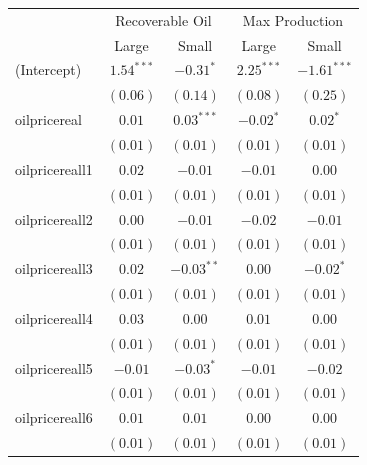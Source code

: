 \documentclass[11pt]{article}
\begin{document}
\begin{spacing}{1}
\begin{table}
\begin{center}
\begin{tabular}{l c c c c }
\hline
&\multicolumn{2}{c}{Recoverable Oil} & \multicolumn{2}{c}{Max Production} \\
                                    & Large & Small & Large & Small \\
\hline
(Intercept)                         & $1.54^{***}$  & $-0.31^{*}$   & $2.25^{***}$  & $-1.61^{***}$ \\
                                    & $(0.06)$      & $(0.14)$      & $(0.08)$      & $(0.25)$      \\
oilpricereal                      & $0.01$        & $0.03^{***}$  & $-0.02^{*}$   & $0.02^{*}$    \\
                                    & $(0.01)$      & $(0.01)$      & $(0.01)$      & $(0.01)$      \\
oilpricereall1                   & $0.02$        & $-0.01$       & $-0.01$       & $0.00$        \\
                                    & $(0.01)$      & $(0.01)$      & $(0.01)$      & $(0.01)$      \\
oilpricereall2                   & $0.00$        & $-0.01$       & $-0.02$       & $-0.01$       \\
                                    & $(0.01)$      & $(0.01)$      & $(0.01)$      & $(0.01)$      \\
oilpricereall3                   & $0.02$        & $-0.03^{**}$  & $0.00$        & $-0.02^{*}$   \\
                                    & $(0.01)$      & $(0.01)$      & $(0.01)$      & $(0.01)$      \\
oilpricereall4                   & $0.03$        & $0.00$        & $0.01$        & $0.00$        \\
                                    & $(0.01)$      & $(0.01)$      & $(0.01)$      & $(0.01)$      \\
oilpricereall5                   & $-0.01$       & $-0.03^{*}$   & $-0.01$       & $-0.02$       \\
                                    & $(0.01)$      & $(0.01)$      & $(0.01)$      & $(0.01)$      \\
oilpricereall6                   & $0.01$        & $0.01$        & $0.00$        & $0.00$        \\
                                    & $(0.01)$      & $(0.01)$      & $(0.01)$      & $(0.01)$      \\

\end{tabular}
\end{center}
\end{table}
\end{spacing}
\end{document}
